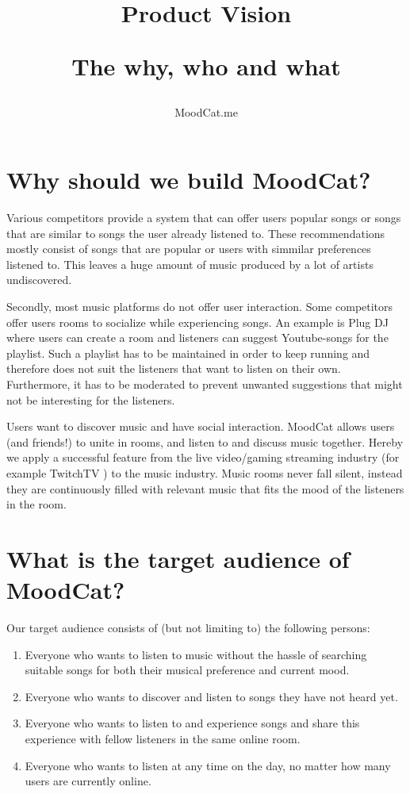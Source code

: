 \documentclass[10pt,a4paper]{article}
\begin{document}
\title{Product Vision\\
	\begin{small}
	The why, who and what
	\end{small}
}
\author{MoodCat.me}
\maketitle

\section{Why should we build MoodCat?}
Various competitors provide a system that can offer users popular songs or songs that are similar to songs the user already listened to.
These recommendations mostly consist of songs that are popular or users with simmilar preferences listened to.
This leaves a huge amount of music produced by a lot of artists undiscovered.

Secondly, most music platforms do not offer user interaction.
Some competitors offer users rooms to socialize while experiencing songs.
An example is Plug DJ \cite{PlugDJ} where users can create a room and listeners can suggest Youtube-songs\cite{Youtube} for the playlist.
Such a playlist has to be maintained in order to keep running and therefore does not suit the listeners that want to listen on their own.
Furthermore, it has to be moderated to prevent unwanted suggestions that might not be interesting for the listeners.

\bigskip 

Users want to discover music and have social interaction.
MoodCat allows users (and friends!) to unite in rooms, and listen to and discuss music together.
Hereby we apply a successful feature from the live video/gaming streaming industry (for example TwitchTV \cite{Twitch}) to the music industry.
Music rooms never fall silent, instead they are continuously filled with relevant music that fits the mood of the listeners in the room.

\section{What is the target audience of MoodCat?}
Our target audience consists of (but not limiting to) the following persons:

\begin{enumerate}
\item Everyone who wants to listen to music without the hassle of searching suitable songs for both their musical preference and current mood.

\item Everyone who wants to discover and listen to songs they have not heard yet.

\item Everyone who wants to listen to and experience songs and share this experience with fellow listeners in the same online room.

\item Everyone who wants to listen at any time on the day, no matter how many users are currently online.
\end{enumerate}
\end{document}
